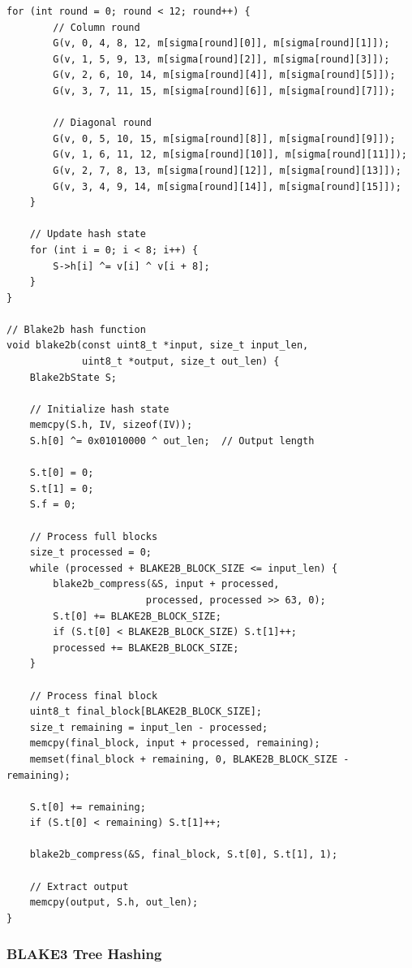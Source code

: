 \begin{lstlisting}[style=cstyle, caption={BLAKE2b Compression Function}]
    for (int round = 0; round < 12; round++) {
        // Column round
        G(v, 0, 4, 8, 12, m[sigma[round][0]], m[sigma[round][1]]);
        G(v, 1, 5, 9, 13, m[sigma[round][2]], m[sigma[round][3]]);
        G(v, 2, 6, 10, 14, m[sigma[round][4]], m[sigma[round][5]]);
        G(v, 3, 7, 11, 15, m[sigma[round][6]], m[sigma[round][7]]);
        
        // Diagonal round
        G(v, 0, 5, 10, 15, m[sigma[round][8]], m[sigma[round][9]]);
        G(v, 1, 6, 11, 12, m[sigma[round][10]], m[sigma[round][11]]);
        G(v, 2, 7, 8, 13, m[sigma[round][12]], m[sigma[round][13]]);
        G(v, 3, 4, 9, 14, m[sigma[round][14]], m[sigma[round][15]]);
    }
    
    // Update hash state
    for (int i = 0; i < 8; i++) {
        S->h[i] ^= v[i] ^ v[i + 8];
    }
}

// Blake2b hash function
void blake2b(const uint8_t *input, size_t input_len, 
             uint8_t *output, size_t out_len) {
    Blake2bState S;
    
    // Initialize hash state
    memcpy(S.h, IV, sizeof(IV));
    S.h[0] ^= 0x01010000 ^ out_len;  // Output length
    
    S.t[0] = 0;
    S.t[1] = 0;
    S.f = 0;
    
    // Process full blocks
    size_t processed = 0;
    while (processed + BLAKE2B_BLOCK_SIZE <= input_len) {
        blake2b_compress(&S, input + processed, 
                        processed, processed >> 63, 0);
        S.t[0] += BLAKE2B_BLOCK_SIZE;
        if (S.t[0] < BLAKE2B_BLOCK_SIZE) S.t[1]++;
        processed += BLAKE2B_BLOCK_SIZE;
    }
    
    // Process final block
    uint8_t final_block[BLAKE2B_BLOCK_SIZE];
    size_t remaining = input_len - processed;
    memcpy(final_block, input + processed, remaining);
    memset(final_block + remaining, 0, BLAKE2B_BLOCK_SIZE - remaining);
    
    S.t[0] += remaining;
    if (S.t[0] < remaining) S.t[1]++;
    
    blake2b_compress(&S, final_block, S.t[0], S.t[1], 1);
    
    // Extract output
    memcpy(output, S.h, out_len);
}
\end{lstlisting}

\subsubsection{BLAKE3 Tree Hashing}

